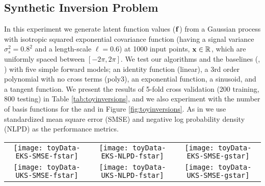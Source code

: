 \subsection{Synthetic Inversion Problem}
In this experiment we generate latent function values ($\mathbf{f}$) from a
Gaussian process with isotropic squared exponential covariance function (having
a signal variance  $\sigma^2_s = 0.8^2$ and a length-scale $\ell = 0.6$) at
1000 input points, $\mathbf{x} \in \mathbb{R}^{}$, which are uniformly spaced between
$[-2\pi, 2\pi]$. We test our algorithms and the baselines (\ugp, \egp) with
five simple forward models; an identity function (linear), a 3rd order
polynomial with no cross terms (poly3), an exponential function, a sinusoid,
and a tangent function. We present the results of 5-fold cross validation (200
training, 800 testing) in Table \ref{tab:toyinversions}, and we also experiment
with the number of basis functions for the \eks and \uks in
Figure \ref{fig:toyinversions}. As in \citet{steinberg-bonilla-nips-2014} we
use standardized mean square error (SMSE) and negative log probability density
(NLPD) as the performance metrics.
%
\begin{table}[h]
\caption{Performance of the \eks and \uks methods compared to their GP counterparts (\egp and \ugp) on a range of synthetic benchmarks. 
\gp the corresponds to the GP analytical solution in the linear case.
\label{tab:toyinversions}
}

\begin{center}
\begin{scriptsize}

\end{scriptsize}
\end{center}
\end{table}
%
\begin{figure*}
\centering
\begin{tabular}{c c c}
\texttt{[image: toyData-EKS-SMSE-fstar]} &
\texttt{[image: toyData-EKS-NLPD-fstar]} &
\texttt{[image: toyData-EKS-SMSE-gstar]} \\
\texttt{[image: toyData-UKS-SMSE-fstar]} &
\texttt{[image: toyData-UKS-NLPD-fstar]} &
\texttt{[image: toyData-UKS-SMSE-gstar]} \\
\end{tabular}
\caption{The performance of the \eks (top) and \uks (bottom)
on the synthetic inversion problems as a function of the number of features used. 
\label{fig:toyinversions}
}
\end{figure*}
%
